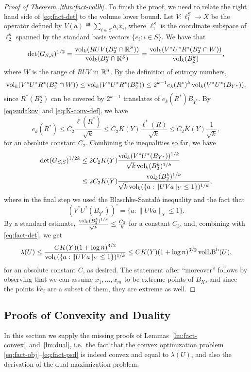 \begin{proof}[Proof of Theorem~\ref{thm:fact-vollb}]
  To finish the proof, we need to relate the right hand side of
  \eqref{eq:fact-det} to the volume lower bound. Let $V:\ell_1^S \to X$ be
  the operator defined by $V(a) \eqdef \sum_{i \in S}{a_i x_i}$, where
  $\ell_1^S$ is the coordinate subspace of $\ell_2^n$ spanned by the standard
  basis vectors $\{e_i: i \in S\}$. We have that 
  \[
  \det(G_{S,S})^{1/2} 
  = \frac{\operatorname{vol}_k(RUV(B_2^n\cap {\mathbb{R}}^S))}{\operatorname{vol}_k(B_2^n \cap {\mathbb{R}}^S)}
  = \frac{\operatorname{vol}_k(V^*U^*R^*(B^n_2\cap W))}{\operatorname{vol}_k(B_2^k)},
  \]
  where $W$ is the range of $RUV$ in ${\mathbb{R}}^n$. By the definition of
  entropy numbers,
  \[
  \operatorname{vol}_k(V^*U^*R^*(B^n_2\cap W))\le
  \operatorname{vol}_k(V^*U^*R^*(B_2^n))
  \le 2^{k-1}e_k(R^*)^k \operatorname{vol}_k(V^*U^*(B_{Y^*})), 
  \]
  since $R^*(B_2^n)$ can be covered by $2^{k-1}$ translates of
  $e_k(R^*)B_{Y^*}$. By \eqref{eq:sudakov} and \eqref{eq:K-conv-def}, we
  have
  \[
  e_k(R^*) \le C_2 \frac{\ell(R^*)}{\sqrt{k}} 
  \le C_2 K(Y) \frac{\ell^*(R)}{\sqrt{k}}
  \le C_2 K(Y) \frac{1}{\sqrt{k}},
  \]
  for an absolute constant $C_2$. Combining the inequalities so far,
  we have
  \begin{align*}
  \det(G_{S,S})^{1/2k} &\le
  2C_2 K(Y) 
  \frac{\operatorname{vol}_k(V^*U^*(B_{Y^*}))^{1/k}}{\sqrt{k}\operatorname{vol}_k(B_2^k)^{1/k}}\\
  &\le
  2C_2 K(Y)
  \frac{\operatorname{vol}_k(B_2^k)^{1/k}}{\sqrt{k}\operatorname{vol}_k(\{a: \|UVa\|_Y\le 1\})^{1/k}},
  \end{align*}
  where in the final step we used the Blaschke-Santal\'{o} inequality and
  the fact that 
  \[
  (V^*U^*(B_{Y^*}))^\circ = \{a: \|UVa\|_Y\le 1\}.
  \]
  By a standard estimate, $\frac{\operatorname{vol}_k(B_2^k)^{1/k}}{\sqrt{k}} \le
   \frac{C_3}{k}$ for a constant $C_3$, and, combining with \eqref{eq:fact-det}, we get
  \[
  \lambda(U)\le \frac{C K(Y) (1+\log n)^{3/2} }{\operatorname{vol}_k(\{a: \|UVa\|_Y\le 1\})^{1/k}}
  \le C K(Y) (1+\log n)^{3/2} \operatorname{volLB}^{\rm h}(U),
  \]
  for an absolute constant $C$, as desired. The statement after
  ``moreover'' follows by observing that we can assume $x_1, \ldots,
  x_m$ to be extreme points of $B_X$, and since the points $Ve_i$ are
  a subset of them, they are extreme as well.
\end{proof}

\subsection{Proofs of Convexity and Duality}
\label{sect:fact-proofs}

In this section we supply the missing proofs of
Lemmas~\ref{lm:fact-convex}~and~\ref{lm:dual}, i.e.~the fact that the
convex optimization  problem \eqref{eq:fact-obj}--\eqref{eq:fact-psd}
is indeed convex and equal to $\lambda(U)$, and also the derivation of
the dual maximization problem. 

